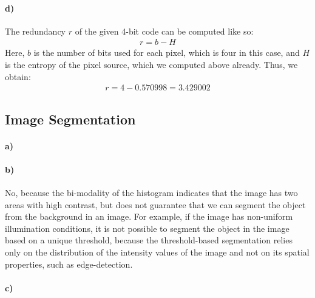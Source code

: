 \documentclass[a4paper,twocolumn]{article}
\begin{document}
	\paragraph{d)} %
	The redundancy $r$ of the given 4-bit code can be computed like so:
	\begin{align*}
	r = b - H
	\end{align*}
	Here, $b$ is the number of bits used for each pixel, which is four in this case, and $H$ is the entropy of the pixel source, which we computed above already. Thus, we obtain:
	\begin{align*}
		r = 4 - 0.570998 = 3.429002
	\end{align*}
	
	\subsection{Image Segmentation}
	
	\paragraph{a)} %
	
	
	\paragraph{b)} %
	No, because the bi-modality of the histogram indicates that the image has two areas with high contrast, but does not guarantee that we can segment the object from the background in an image. For example, if the image has non-uniform illumination conditions, it is not possible to segment the object in the image based on a unique threshold, because the threshold-based segmentation relies only on the distribution of the intensity values of the image and not on its spatial properties, such as edge-detection.
	
	\paragraph{c)} %
	
\end{document}
